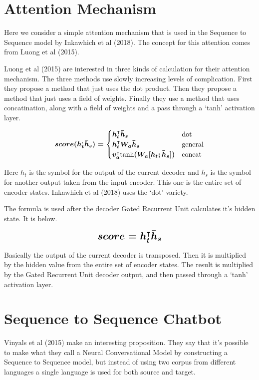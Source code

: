 \section{Attention Mechanism}

Here we consider a simple attention mechanism that is used in the Sequence to Sequence model by Inkawhich et al (2018)\cite{2018Inkawhich}. The concept for this attention comes from Luong et al (2015)\cite{DBLP:journals/corr/LuongPM15}.

Luong et al (2015)\cite{DBLP:journals/corr/LuongPM15} are interested in three kinds of calculation for their attention mechanism. The three methods use slowly increasing levels of complication. First they propose a method that just uses the dot product. Then they propose a method that just uses a field of weights. Finally they use a method that uses concatination, along with a field of weights and a pass through a `tanh' activation layer.

$$
\boldmath
score(h_t^ \text{,} \bar{h}_s) =
\begin{cases}
    h_t^\intercal \bar{h}_s & \text{dot} \\
	h_t^\intercal W_a \bar{h}_s & \text{general} \\
	v_a^\intercal \text{tanh}(W_a [h_t ; \bar{h}_s] ) & \text{concat}
\end{cases}
\unboldmath
$$

Here $h_t$ is the symbol for the output of the current decoder and $\bar{h}_s $ is the symbol for another output taken from the input encoder. This one is the entire set of encoder states. Inkawhich et al (2018)\cite{2018Inkawhich} uses the `dot' variety.

The formula is used after the decoder Gated Recurrent Unit calculates it's hidden state. It is below.

$$ 
\boldmath
\mathlarger{ \mathlarger{
score = h_t^\intercal \bar{h}_s 
} }
\unboldmath
$$ 

Basically the output of the current decoder is transposed. Then it is multiplied by the hidden value from the entire set of encoder states. The result is multiplied by the Gated Recurrent Unit decoder output, and then passed through a `tanh' activation layer.

\section{Sequence to Sequence Chatbot}

Vinyals et al (2015)\cite{DBLP:journals/corr/VinyalsL15} make an interesting proposition. They say that it's possible to make what they call a Neural Conversational Model by constructing a Sequence to Sequence model, but instead of using two corpus from different languages a single language is used for both source and target.

